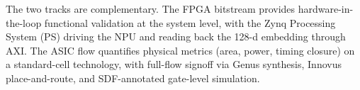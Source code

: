 The two tracks are complementary. The FPGA bitstream provides hardware-in-the-loop functional validation at the system level, with the Zynq Processing System (PS) driving the NPU and reading back the 128-d embedding through AXI. The ASIC flow quantifies physical metrics (area, power, timing closure) on a standard-cell technology, with full-flow signoff via Genus synthesis, Innovus place-and-route, and SDF-annotated gate-level simulation.
